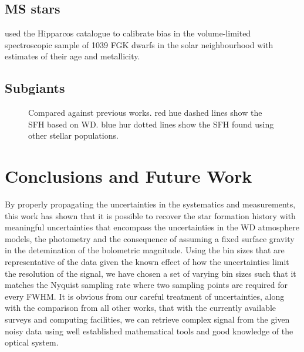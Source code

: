 \documentclass[fleqn,usenatbib]{mnras}
\newcommand{\dummyfig}[1]{
  \centering
  \fbox{
    \begin{minipage}[c][0.25\textheight][c]{\columnwidth}
      \centering{#1}
    \end{minipage}
  }
}
\begin{document}
\subsection{MS stars}
\citet{2006A&A...459..783C}

\citet{2007ApJ...665..767R} used the Hipparcos catalogue to calibrate
bias in the \citep{2005ApJS..159..141V} volume-limited spectroscopic
sample of 1039 FGK dwarfs in the solar neighbourhood with estimates of
their age and metallicity.

\citet{2019A&A...624L...1M}

\subsection{Subgiants}
\citet{2022Natur.603..599X}


\begin{figure}
  \dummyfig{Comparison} 
  \caption{Compared against previous works. red hue dashed lines show the SFH
  based on WD. blue hur dotted lines show the SFH found using other stellar
  populations.}
  \label{fig:dummy3}
\end{figure}

\section{Conclusions and Future Work}
\label{sec:conclusion}
By properly propagating the uncertainties in the
systematics and measurements, this work has shown that it is
possible to recover the star formation history with meaningful
uncertainties that encompass the uncertainties in the WD atmosphere
models, the photometry and the consequence of assuming a fixed
surface gravity in the detemination of the bolometric magnitude.
Using the bin sizes that are representative of the data given the
known effect of how the uncertainties limit the resolution of
the signal, we have chosen a set of varying bin sizes such that
it matches the Nyquist sampling rate where two sampling points are
required for every FWHM. It is obvious from our careful treatment
of uncertainties, along with the comparison from all other
works, that with the currently available surveys and computing
facilities, we can retrieve complex signal from the given noisy
data using well established mathematical tools and good knowledge
of the optical system.
\end{document}
